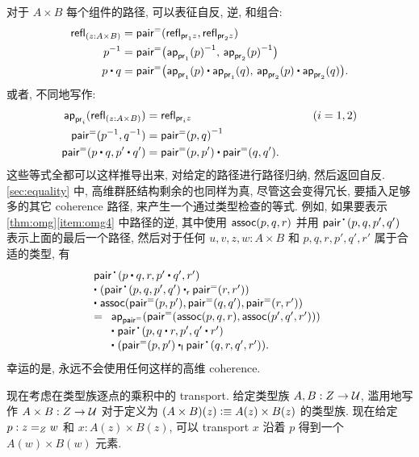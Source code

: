 对于 $A\times B$ 每个组件的路径, 可以表征自反, 逆, 和组合:
\begin{align*}
  {\refl{(z : A \times B)}}
  &= {\pairpath (\refl{\proj{1} z},\refl{\proj{2} z})} \\
  {\opp{p}}
  &= {\pairpath \big(\opp{\projpath{1} (p)},\, \opp{\projpath{2} (p)}\big)} \\
  {{p \ct q}}
  &= {\pairpath \big({\projpath{1} (p)} \ct {\projpath{1} (q)},\,{\projpath{2} (p)} \ct {\projpath{2} (q)}\big)}.
\end{align*}
或者, 不同地写作:
\begin{alignat*}{2}
  \projpath{i}(\refl{(z : A \times B)}) &= \refl{\proj{i} z} &\qquad (i=1,2)\\
  \pairpath(\opp p, \opp q) &= \opp{\pairpath(p,q)}\\
  \pairpath(p\ct q, p'\ct q') &= \pairpath(p,p') \ct \pairpath(q,q').
\end{alignat*}
这些等式全都可以这样推导出来, 对给定的路径进行路径归纳, 然后返回自反.
\cref{sec:equality} 中, 高维群胚结构剩余的也同样为真, 尽管这会变得冗长, 要插入足够多的其它 coherence 路径, 来产生一个通过类型检查的等式.
例如, 如果要表示 \cref{thm:omg}\ref{item:omg4} 中路径的逆, 其中使用 $\ctassoc(p,q,r)$ 并用 $\pairct(p,q,p',q')$ 表示上面的最后一个路径, 然后对于任何 $u,v,z,w:A\times B$ 和 $p,q,r,p',q',r'$ 属于合适的类型, 有
\begin{equation*}
  \begin{array}{l}
    \pairct(p\ct q, r, p'\ct q', r') \\
    \ct\;  (\pairct(p,q,p',q') \rightwhisker \pairpath(r,r')) \\
    \ct\;  \ctassoc(\pairpath(p,p'),\pairpath(q,q'),\pairpath(r,r'))\\
    =
    \begin{array}[t]{l}
      \apfunc{\pairpath}({\pairpath(\ctassoc(p,q,r),\ctassoc(p',q',r'))})\\
      \ct\; \pairct(p, q\ct r, p', q'\ct r')\\
      \ct\; (\pairpath(p,p') \leftwhisker \pairct(q,r,q',r')).
    \end{array}
  \end{array}
\end{equation*}
幸运的是, 永远不会使用任何这样的高维 coherence.

%
现在考虑在类型族逐点的乘积中的 transport.
给定类型族 $ A, B : Z \to \type$, 滥用地写作 $A\times B:Z\to \type$ 对于定义为 $(A\times B)(z) \defeq A(z) \times B(z)$ 的类型族.
现在给定 $p : \id[Z]{z}{w}$ 和 $x : A(z) \times B(z)$, 可以 transport $x$ 沿着 $p$ 得到一个 $A(w)\times B(w)$ 元素.

